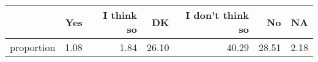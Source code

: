 \begin{table}[ht]
\centering
\begin{tabular}{rrrrrrr}
  \hline
 & Yes & I think so & DK & I don't think so & No & NA \\ 
  \hline
proportion & 1.08 & 1.84 & 26.10 & 40.29 & 28.51 & 2.18 \\ 
   \hline
\end{tabular}
\end{table}
